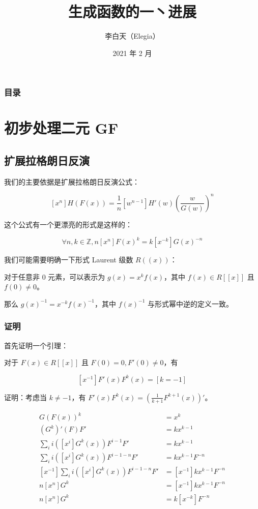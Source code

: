 \documentclass[mathserif]{ctexbeamer}
\title{生成函数的一丶进展}
\author{李白天（Elegia）}
\date{2021 年 2 月}
\institute{北京大学附属中学}
\begin{document}
\frame{\titlepage}

\frame
{
  \frametitle{目录}
  \begin{multicols}{2}
  \tableofcontents
  \end{multicols}
}

\section{初步处理二元 GF}
\frame{\sectionpage}

\subsection{扩展拉格朗日反演}
\frame
{
  我们的主要依据是扩展拉格朗日反演公式：
  
  $$
  [x^n] H(F(x)) = \frac 1n [w^{n-1}] H'(w) \left(\frac{w}{G(w)}\right)^n
  $$
  
  这个公式有一个更漂亮的形式是这样的：
  
  $$
  \forall n,k\in \mathbb Z, n[x^n]F(x)^k = k[x^{-k}] G(x)^{-n}
  $$
}

\frame
{
  我们可能需要明确一下形式 Laurent 级数 $R((x))$：
  
  对于任意非 0 元素，可以表示为 $g(x)=x^k f(x)$，其中 $f(x) \in R[[x]]$ 且 $f(0)\neq 0$。
  
  那么 $g(x)^{-1} = x^{-k} f(x)^{-1}$，其中 $f(x)^{-1}$ 与形式幂中逆的定义一致。
}

\frame
{
  \frametitle{证明}
  
  首先证明一个引理：
  
  \begin{lemma}[形式留数]
  对于 $F(x)\in R[[x]]$ 且 $F(0)=0, F'(0)\neq 0$，有
  
  $$[x^{-1} ]F'(x)F^{k} (x)=[k=-1]$$
  
  证明：考虑当 $k\neq -1$，有 $F'(x)F^{k} (x)=\left(\frac{1}{k+1} F^{k+1} (x)\right) '$。
  \end{lemma}
}

\frame
{
  \begin{align*}
  G(F(x))^{k} & =x^{k}\\
  (G^{k} )'(F)F' & =kx^{k-1}\\
  \sum _{i} i([x^{i} ]G^{k} (x))F^{i-1} F' & =kx^{k-1}\\
  \sum _{i} i([x^{i} ]G^{k} (x))F^{i-1-n} F' & =kx^{k-1} F^{-n}\\
  \left[ x^{-1}\right]\sum _{i} i([x^{i} ]G^{k} (x))F^{i-1-n} F' & =[x^{-1} ]kx^{k-1} F^{-n}\\
  n[x^{n} ]G^{k} & =[x^{-1} ]kx^{k-1} F^{-n}\\
  n[x^{n} ]G^{k} & =k[x^{-k} ]F^{-n}
  \end{align*}
}
\end{document}
